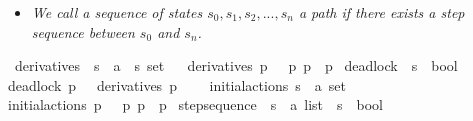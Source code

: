 \begin{isabellebody}
\begin{isamarkuptext}
\begin{itemize}
    \item \textit{We call a sequence of states $s_0, s_1, s_2, ..., s_n$ a \textnormal{path} if there exists a step sequence between $s_0$ and $s_n$.}
\end{itemize}%
\end{isamarkuptext}\isamarkuptrue%
\isamarkupfalse%
\ derivatives\ {\isacharcolon}{\kern0pt}{\isacharcolon}{\kern0pt}\ {\isacartoucheopen}{\isacharprime}{\kern0pt}s\ {\isasymRightarrow}\ {\isacharprime}{\kern0pt}a\ {\isasymRightarrow}\ {\isacharprime}{\kern0pt}s\ set{\isacartoucheclose}\isanewline
\ \ \isanewline
{\isacartoucheopen}derivatives\ p\ {\isasymalpha}\ {\isasymequiv}\ {\isacharbraceleft}{\kern0pt}p{\isacharprime}{\kern0pt}{\isachardot}{\kern0pt}\ p\ {\isasymmapsto}{\isasymalpha}\ p{\isacharprime}{\kern0pt}{\isacharbraceright}{\kern0pt}{\isacartoucheclose}\isanewline
\isanewline
{}\isamarkupfalse%
\ deadlock\ {\isacharcolon}{\kern0pt}{\isacharcolon}{\kern0pt}\ {\isacartoucheopen}{\isacharprime}{\kern0pt}s\ {\isasymRightarrow}\ bool{\isacartoucheclose}\ \isanewline
{\isacartoucheopen}deadlock\ p\ {\isasymequiv}\ {\isacharparenleft}{\kern0pt}{\isasymforall}{\isasymalpha}{\isachardot}{\kern0pt}\ derivatives\ p\ {\isasymalpha}\ {\isacharequal}{\kern0pt}\ {\isacharbraceleft}{\kern0pt}{\isacharbraceright}{\kern0pt}{\isacharparenright}{\kern0pt}{\isacartoucheclose}\isanewline
\isanewline
{}\isamarkupfalse%
\ initial{\isacharunderscore}{\kern0pt}actions{\isacharcolon}{\kern0pt}{\isacharcolon}{\kern0pt}\ {\isacartoucheopen}{\isacharprime}{\kern0pt}s\ {\isasymRightarrow}\ {\isacharprime}{\kern0pt}a\ set{\isacartoucheclose}\isanewline
\ \ \isanewline
{\isacartoucheopen}initial{\isacharunderscore}{\kern0pt}actions\ p\ {\isasymequiv}\ {\isacharbraceleft}{\kern0pt}{\isasymalpha}{\isacharbar}{\kern0pt}{\isasymalpha}{\isachardot}{\kern0pt}\ {\isacharparenleft}{\kern0pt}{\isasymexists}p{\isacharprime}{\kern0pt}{\isachardot}{\kern0pt}\ p\ {\isasymmapsto}{\isasymalpha}\ p{\isacharprime}{\kern0pt}{\isacharparenright}{\kern0pt}{\isacharbraceright}{\kern0pt}{\isacartoucheclose}\isanewline
\isanewline
{}\isamarkupfalse%
\ step{\isacharunderscore}{\kern0pt}sequence\ {\isacharcolon}{\kern0pt}{\isacharcolon}{\kern0pt}\ {\isacartoucheopen}{\isacharprime}{\kern0pt}s\ {\isasymRightarrow}\ {\isacharprime}{\kern0pt}a\ list\ {\isasymRightarrow}\ {\isacharprime}{\kern0pt}s\ {\isasymRightarrow}\ bool{\isacartoucheclose}\ {\isacharparenleft}{\kern0pt}{\isacartoucheopen}{\isacharunderscore}{\kern0pt}\ {\isasymmapsto}{\isachardollar}{\kern0pt}\ {\isacharunderscore}{\kern0pt}\ {\isacharunderscore}{\kern0pt}{\isacartoucheclose}{\isacharbrackleft}{\kern0pt}{}{}{\isacharcomma}{\kern0pt}{}{}{\isacharcomma}{\kern0pt}{}{}{\isacharbrackright}{\kern0pt}\ {}{}{\isacharparenright}{\kern0pt}\ \isanewline

\end{isabellebody}
